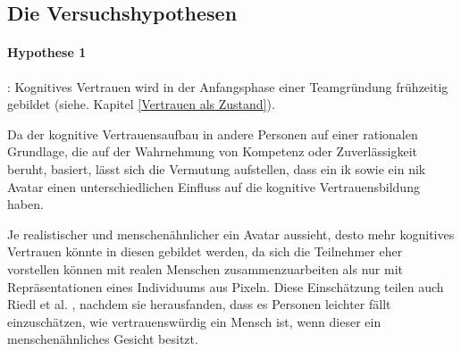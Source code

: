 \documentclass[a4paper,11pt]{article}%
\renewcommand{\\}{\vspace*{0.5\baselineskip} \newline}
\begin{document}
\newpage



\subsection{Die Versuchshypothesen}
\label{VersuchshypothesenAuflistung}

\paragraph{Hypothese 1}:
Kognitives Vertrauen wird in der Anfangsphase einer Teamgründung frühzeitig gebildet (siehe. Kapitel \ref{Vertrauen als Zustand}).

Da der kognitive Vertrauensaufbau in andere Personen auf einer rationalen Grundlage, die auf der Wahrnehmung von Kompetenz oder Zuverlässigkeit beruht, basiert, lässt sich die Vermutung aufstellen, dass ein \ac{ik} sowie ein \ac{nik} Avatar einen unterschiedlichen Einfluss auf die kognitive Vertrauensbildung haben.

Je realistischer und menschenähnlicher ein Avatar aussieht, desto mehr kognitives Vertrauen könnte in diesen gebildet werden, da sich die Teilnehmer eher vorstellen können mit realen Menschen zusammenzuarbeiten als nur mit Repräsentationen eines Individuums aus Pixeln. Diese Einschätzung teilen auch Riedl et al. \citep{riedl2014trusting}, nachdem sie herausfanden, dass es Personen leichter fällt einzuschätzen, wie vertrauenswürdig ein Mensch ist, wenn dieser ein menschenähnliches Gesicht besitzt.
\end{document}
